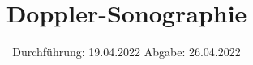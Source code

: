 

\subject{US3}
\title{Doppler-Sonographie}
\date{
  Durchführung: 19.04.2022
  \hspace{3em}
  Abgabe: 26.04.2022
}



\maketitle
\thispagestyle{empty}
\tableofcontents
\newpage







